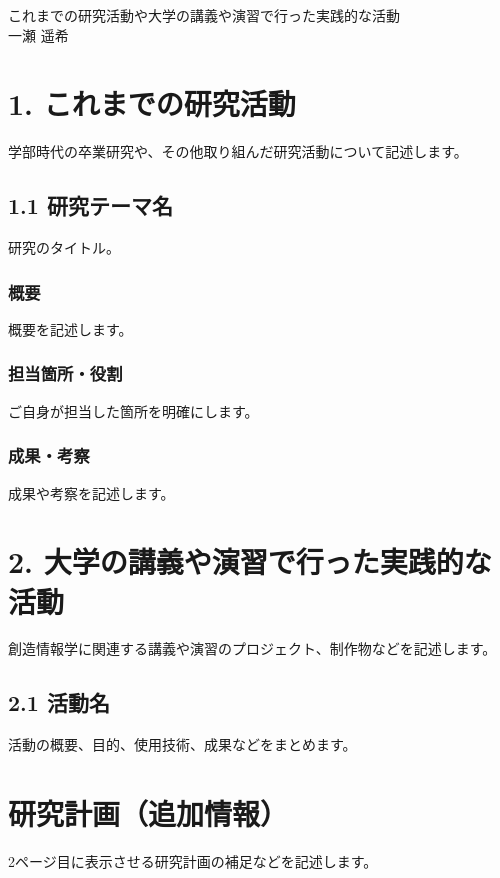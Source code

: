 \documentclass[dvipdfmx]{jsarticle}
\begin{document}
\begin{center}
    {\Large これまでの研究活動や大学の講義や演習で行った実践的な活動}\\[0.5em]
    一瀬 遥希
\end{center}

\section*{1. これまでの研究活動}
学部時代の卒業研究や、その他取り組んだ研究活動について記述します。

\subsection*{1.1 研究テーマ名}
研究のタイトル。

\subsubsection*{概要}
概要を記述します。

\subsubsection*{担当箇所・役割}
ご自身が担当した箇所を明確にします。

\subsubsection*{成果・考察}
成果や考察を記述します。

\section*{2. 大学の講義や演習で行った実践的な活動}
創造情報学に関連する講義や演習のプロジェクト、制作物などを記述します。

\subsection*{2.1 活動名}
活動の概要、目的、使用技術、成果などをまとめます。

\section*{研究計画（追加情報）}
2ページ目に表示させる研究計画の補足などを記述します。
\end{document}
